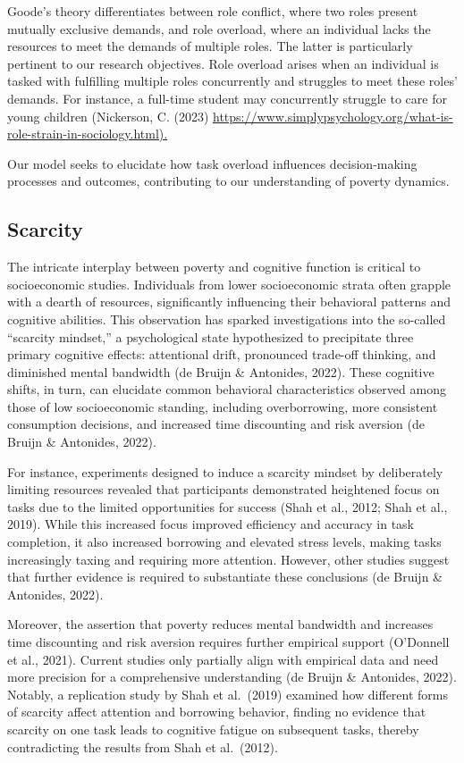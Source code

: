\documentclass[
]{report}
\begin{document}
Goode's theory differentiates between role conflict, where two roles
present mutually exclusive demands, and role overload, where an
individual lacks the resources to meet the demands of multiple roles.
The latter is particularly pertinent to our research objectives. Role
overload arises when an individual is tasked with fulfilling multiple
roles concurrently and struggles to meet these roles' demands. For
instance, a full-time student may concurrently struggle to care for
young children (Nickerson, C. (2023)
\url{https://www.simplypsychology.org/what-is-role-strain-in-sociology.html).}

Our model seeks to elucidate how task overload influences
decision-making processes and outcomes, contributing to our
understanding of poverty dynamics.

\hypertarget{scarcity}{%
\subsection{Scarcity}\label{scarcity}}

The intricate interplay between poverty and cognitive function is
critical to socioeconomic studies. Individuals from lower socioeconomic
strata often grapple with a dearth of resources, significantly
influencing their behavioral patterns and cognitive abilities. This
observation has sparked investigations into the so-called ``scarcity
mindset,'' a psychological state hypothesized to precipitate three
primary cognitive effects: attentional drift, pronounced trade-off
thinking, and diminished mental bandwidth (de Bruijn \& Antonides,
2022). These cognitive shifts, in turn, can elucidate common behavioral
characteristics observed among those of low socioeconomic standing,
including overborrowing, more consistent consumption decisions, and
increased time discounting and risk aversion (de Bruijn \& Antonides,
2022).

For instance, experiments designed to induce a scarcity mindset by
deliberately limiting resources revealed that participants demonstrated
heightened focus on tasks due to the limited opportunities for success
(Shah et al., 2012; Shah et al., 2019). While this increased focus
improved efficiency and accuracy in task completion, it also increased
borrowing and elevated stress levels, making tasks increasingly taxing
and requiring more attention. However, other studies suggest that
further evidence is required to substantiate these conclusions (de
Bruijn \& Antonides, 2022).

Moreover, the assertion that poverty reduces mental bandwidth and
increases time discounting and risk aversion requires further empirical
support (O'Donnell et al., 2021). Current studies only partially align
with empirical data and need more precision for a comprehensive
understanding (de Bruijn \& Antonides, 2022). Notably, a replication
study by Shah et al.~(2019) examined how different forms of scarcity
affect attention and borrowing behavior, finding no evidence that
scarcity on one task leads to cognitive fatigue on subsequent tasks,
thereby contradicting the results from Shah et al.~(2012).
\end{document}
